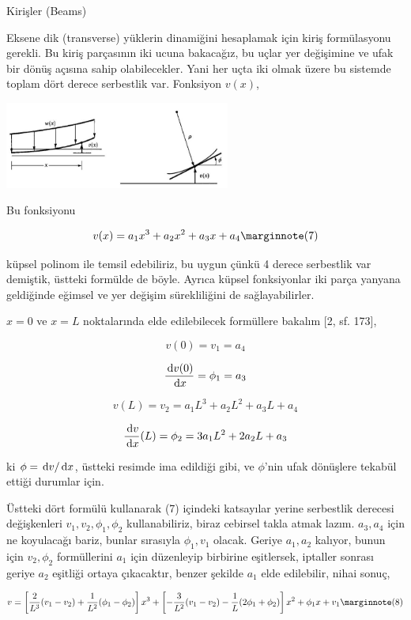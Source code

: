 \documentclass[12pt,fleqn]{article}\usepackage{../../common}
\begin{document}
Kirişler (Beams)

Eksene dik (transverse) yüklerin dinamiğini hesaplamak için kiriş formülasyonu
gerekli. Bu kiriş parçasının iki ucuna bakacağız, bu uçlar yer değişimine ve
ufak bir dönüş açısına sahip olabilecekler. Yani her uçta iki olmak üzere
bu sistemde toplam dört derece serbestlik var. Fonksiyon $v(x)$,

\includegraphics[width=20em]{phy_020_strs_05_09.jpg}

Bu fonksiyonu

$$
v(x) = a_1 x^3 + a_2 x^2 + a_3 x + a_4
\mlabel{7}
$$

küpsel polinom ile temsil edebiliriz, bu uygun çünkü 4 derece serbestlik var
demiştik, üstteki formülde de böyle. Ayrıca küpsel fonksiyonlar iki parça
yanyana geldiğinde eğimsel ve yer değişim sürekliliğini de sağlayabilirler.

$x=0$ ve $x=L$ noktalarında elde edilebilecek formüllere bakalım [2, sf. 173],

$$
v(0) = v_1 = a_4
$$

$$
\frac{\,\mathrm{d} v(0)}{\,\mathrm{d} x} = \phi_1 = a_3
$$

$$
v(L) = v_2 = a_1 L^3 + a_2 L^2 + a_3 L + a_4 
$$

$$
\frac{\,\mathrm{d} v}{\,\mathrm{d} x}(L) = \phi_2 = 3 a_1 L^2 + 2 a_2 L + a_3
$$

ki $\phi = \,\mathrm{d} v / \,\mathrm{d} x$, üstteki resimde ima edildiği gibi, ve $\phi$'nin
ufak dönüşlere tekabül ettiği durumlar için.

Üstteki dört formülü kullanarak (7) içindeki katsayılar yerine serbestlik
derecesi değişkenleri $v_1,v_2,\phi_1,\phi_2$ kullanabiliriz, biraz cebirsel
takla atmak lazım. $a_3,a_4$ için ne koyulacağı bariz, bunlar sırasıyla
$\phi_1,v_1$ olacak. Geriye $a_1,a_2$ kalıyor, bunun için $v_2,\phi_2$
formüllerini $a_1$ için düzenleyip birbirine eşitlersek, iptaller sonrası
geriye $a_2$ eşitliği ortaya çıkacaktır, benzer şekilde $a_1$ elde edilebilir,
nihai sonuç,

$$
v =
\left[
  \frac{2}{L^3} (v_1 - v_2) + \frac{1}{L^2} (\phi_1 - \phi_2) 
\right] x^3 +
\left[
  -\frac{3}{L^2} (v_1 - v_2) - \frac{1}{L} (2\phi_1 + \phi_2)
\right] x^2 +
\phi_1 x + v_1
\mlabel{8}
$$
\end{document}
